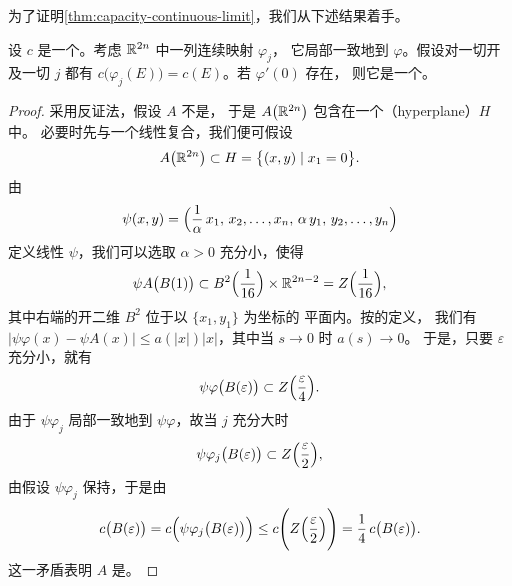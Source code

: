 为了证明\cref{thm:capacity-continuous-limit}，我们从下述结果着手。

\begin{lemma}\label{lem:capacity-derivative-isomorphism}
设 $c$ 是一个\trCapacity。考虑 $\mathbb{R}^{2n}$ 中一列连续映射 $\varphi_j$，%
它局部一致地\trConverge{}到\trMapping{} $\varphi$。假设对一切开\trEllipsoid{}%
及一切 $j$ 都有 $c\bigl(\varphi_j(E)\bigr)=c(E)$。若 $\varphi'(0)$ 存在，%
则它是一个\trIsomorphism。
\end{lemma}

\begin{proof}
采用反证法，假设 $A$ 不是\trSurjective，%
于是 $A\bigl(\mathbb{R}^{2n}\bigr)$ 包含在一个\textbf{\trHyperplane}（hyperplane）$H$ 中。%
必要时先与一个线性\trSymplecticMapping{}复合，我们便可假设
\begin{equation}\label{eq:hyperplane-reduction}
A\bigl(\mathbb{R}^{2n}\bigr)\subset H=\bigl\{(x,y)\mid x_1=0\bigr\}.
\end{equation}
由
\[
\psi(x,y)=\Bigl(\frac{1}{\alpha}\,x_1,\,x_2,\dots,x_n,\,\alpha\,y_1,\,y_2,\dots,y_n\Bigr)
\]
定义线性\trSymplecticMapping{} $\psi$，我们可以选取 $\alpha>0$ 充分小，使得
\[
\psi A\bigl(B(1)\bigr)\subset B^{2}\Bigl(\frac{1}{16}\Bigr)\times\mathbb{R}^{2n-2}
=Z\Bigl(\frac{1}{16}\Bigr),
\]
其中右端的开二维\trDisc{} $B^{2}$ 位于以 $\{x_1,y_1\}$ 为坐标的%
\trSymplectic{}平面内。按\trDerivative{}的定义，%
我们有 $|\psi\varphi(x)-\psi A(x)|\le a(|x|)|x|$，其中当 $s\to0$ 时 $a(s)\to0$。%
于是，只要 $\varepsilon$ 充分小，就有
\[
\psi\varphi\bigl(B(\varepsilon)\bigr)\subset Z\Bigl(\frac{\varepsilon}{4}\Bigr).
\]
由于 $\psi\varphi_j$ 局部一致地\trConverge{}到 $\psi\varphi$，故当 $j$ 充分大时
\[
\psi\varphi_j\bigl(B(\varepsilon)\bigr)\subset Z\Bigl(\frac{\varepsilon}{2}\Bigr),
\]
由假设 $\psi\varphi_j$ 保持\trCapacity，于是由\trMonotonicity
\[
c\bigl(B(\varepsilon)\bigr)=c\Bigl(\psi\varphi_j\bigl(B(\varepsilon)\bigr)\Bigr)
\le c\Biggl(Z\Bigl(\frac{\varepsilon}{2}\Bigr)\Biggr)
=\frac{1}{4}\,c\bigl(B(\varepsilon)\bigr).
\]
这一矛盾表明 $A$ 是\trSurjective。
\end{proof}

